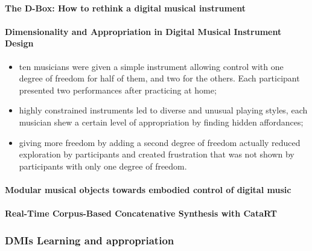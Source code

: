 \documentclass[11pt]{article}
\begin{document}
\paragraph{The D-Box: How to rethink a digital musical instrument} \citep{zappi_d-box_2015} 

\paragraph{Dimensionality and Appropriation in Digital Musical Instrument Design} \citep{zappi_dimensionality_2014}
\begin{itemize}
    \item ten musicians were given a simple instrument allowing control with one degree of freedom for half of them, and two for the others. Each participant presented two performances after practicing at home;
    \item highly constrained instruments led to diverse and unusual playing styles, each musician shew a certain level of appropriation by finding hidden affordances;
    \item giving more freedom by adding a second degree of freedom actually reduced exploration by participants and created frustration that was not shown by participants with only one degree of freedom.
\end{itemize}

\paragraph{Modular musical objects towards embodied control of digital music} \citep{rasamimanana_modular_2011}

\paragraph{Real-Time Corpus-Based Concatenative Synthesis with CataRT} \citep{schwarz_real-time_2006}

\subsubsection{DMIs Learning and appropriation}
\end{document}
